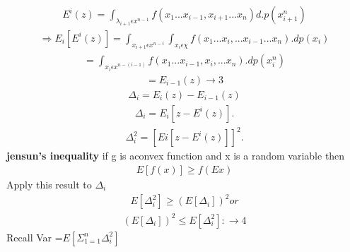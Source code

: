 \documentclass[journal,12pt,twocolumn]{IEEEtran}
\begin{document}
\begin{align}
E^i(z)=\int_{\lambda_{i+1} \epsilon x^{n-1}}f(x_1...x_{i-1},x_{i+1}...x_n)d.p(x_{i+1}^n)
\end{align}
\begin{align}
\Rightarrow E_i[E^i(z)]=\int_{x_{i+1} \epsilon x^{n-i}} \int_{x_i \epsilon \chi}f(x_1...x_i,...x_{i-1}...x_n).dp(x_i)
\end{align}
\begin{align}
=\int_{x_i \epsilon x^{n-(i-1)}}f(x_1...x_{i-1},x_i,...x_n).dp(x_i^n)
\end{align}
\begin{align}
=E_{i-1}(z)\rightarrow 3
\end{align}
\begin{align}
\Delta_i=E_i(z)-E_{i-1}(z)
\end{align}
\begin{align}
\Delta_i=E_i[z-E^i(z)].
\end{align}
\begin{align}
\Delta_i^2=[Ei[z-E^i(z)]]^2.
\end{align}
\textbf{jensun's inequality} if g is aconvex function and x is a random variable then
\begin{align}
E[f(x)] \geqslant f(E{x})
\end{align}
Apply this result to $\Delta_i$
\begin{align}
E[\Delta_i^2] \geqslant (E[\Delta_i])^2 or
\end{align}
\begin{align}
(E[\Delta_i])^2\leqslant E[\Delta_i^2]:\rightarrow 4
\end{align}
 Recall Var =$E[\Sigma_{1=1}^{n} \Delta_i^2]$
\end{document}
